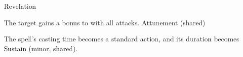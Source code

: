 \begin{spellsection}{Revelation}
\begin{spellheader}
\end{spellheader}
\begin{spellcontent}
\begin{spelltargetinginfo}
\end{spelltargetinginfo}
\begin{spelleffects}
\spelleffect
The target gains a  bonus to  with all attacks.
\spelldur Attunement (shared)
\end{spelleffects}
\end{spellcontent}
\begin{spellfooter}
\end{spellfooter}
\begin{spellsubcontent}
\begin{spellcantrip}
The spell's casting time becomes a standard action, and its duration becomes Sustain (minor, shared).
\end{spellcantrip}
\end{spellsubcontent}
\end{spellsection}
